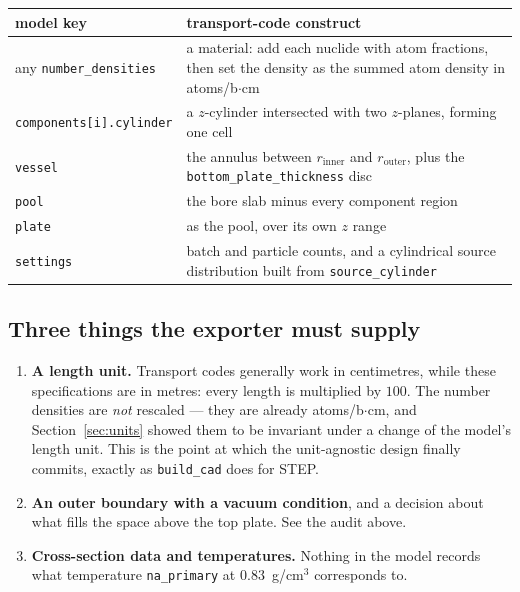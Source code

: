 \documentclass[9pt,a4paper]{extarticle}
\newcommand{\code}[1]{\texttt{\small #1}}
\begin{document}
\begin{center}
\begin{tabular}{@{}lp{9.4cm}@{}}
\toprule
model key & transport-code construct \\
\midrule
any \code{number\_densities} &
  a material: add each nuclide with atom fractions, then set the density as the
  summed atom density in atoms/b$\cdot$cm \\
\code{components[i].cylinder} &
  a $z$-cylinder intersected with two $z$-planes, forming one cell \\
\code{vessel} &
  the annulus between $r_{\mathrm{inner}}$ and $r_{\mathrm{outer}}$, plus the
  \code{bottom\_plate\_thickness} disc \\
\code{pool} &
  the bore slab minus every component region \\
\code{plate} &
  as the pool, over its own $z$ range \\
\code{settings} &
  batch and particle counts, and a cylindrical source distribution built from
  \code{source\_cylinder} \\
\bottomrule
\end{tabular}
\end{center}

\subsection{Three things the exporter must supply}

\begin{enumerate}
  \item \textbf{A length unit.} Transport codes generally work in centimetres,
    while these specifications are in metres: every length is multiplied by
    $100$. The number densities are \emph{not} rescaled --- they are already
    atoms/b$\cdot$cm, and Section~\ref{sec:units} showed them to be invariant
    under a change of the model's length unit. This is the point at which the
    unit-agnostic design finally commits, exactly as \code{build\_cad} does for
    STEP.
  \item \textbf{An outer boundary with a vacuum condition}, and a decision about
    what fills the space above the top plate. See the audit above.
  \item \textbf{Cross-section data and temperatures.} Nothing in the model
    records what temperature \code{na\_primary} at $0.83$~g/cm$^3$ corresponds
    to.
\end{enumerate}

\end{document}
